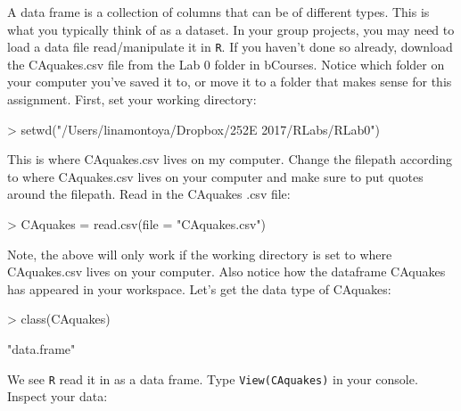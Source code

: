 \documentclass{exam}
\begin{document}
A data frame is a collection of columns that can be of different types. This is what you typically think of as a dataset. In your group projects, you may need to load a data file read/manipulate it in \texttt{R}. If you haven't done so already, download the CAquakes.csv file from the Lab 0 folder in bCourses. Notice which folder on your computer you've saved it to, or move it to a folder that makes sense for this assignment. First, set your working directory:
\begin{Schunk}
\begin{Sinput}
> setwd("/Users/linamontoya/Dropbox/252E 2017/RLabs/RLab0")
\end{Sinput}
\end{Schunk}
\noindent This is where CAquakes.csv lives on my computer. Change the filepath according to where CAquakes.csv lives on your computer and make sure to put quotes around the filepath. Read in the CAquakes .csv file:
\begin{Schunk}
\begin{Sinput}
> CAquakes = read.csv(file = "CAquakes.csv")
\end{Sinput}
\end{Schunk}
\noindent Note, the above will only work if the working directory is set to where CAquakes.csv lives on your computer. Also notice how the dataframe CAquakes has appeared in your workspace. Let's get the data type of CAquakes:
\begin{Schunk}
\begin{Sinput}
> class(CAquakes)
\end{Sinput}
\begin{Soutput}
[1] "data.frame"
\end{Soutput}
\end{Schunk}
\noindent We see \texttt{R} read it in as a data frame. Type \texttt{View(CAquakes)} in your console. Inspect your data:
\end{document}
